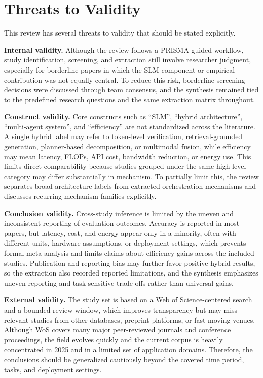 \section{Threats to Validity}
This review has several threats to validity that should be stated explicitly.

\textbf{Internal validity.} Although the review follows a PRISMA-guided workflow, study identification, screening, and extraction still involve researcher judgment, especially for borderline papers in which the SLM component or empirical contribution was not equally central. To reduce this risk, borderline screening decisions were discussed through team consensus, and the synthesis remained tied to the predefined research questions and the same extraction matrix throughout.

\textbf{Construct validity.} Core constructs such as ``SLM'', ``hybrid architecture'', ``multi-agent system'', and ``efficiency'' are not standardized across the literature. A single hybrid label may refer to token-level verification, retrieval-grounded generation, planner-based decomposition, or multimodal fusion, while efficiency may mean latency, FLOPs, API cost, bandwidth reduction, or energy use. This limits direct comparability because studies grouped under the same high-level category may differ substantially in mechanism. To partially limit this, the review separates broad architecture labels from extracted orchestration mechanisms and discusses recurring mechanism families explicitly.

\textbf{Conclusion validity.} Cross-study inference is limited by the uneven and inconsistent reporting of evaluation outcomes. Accuracy is reported in most papers, but latency, cost, and energy appear only in a minority, often with different units, hardware assumptions, or deployment settings, which prevents formal meta-analysis and limits claims about efficiency gains across the included studies. Publication and reporting bias may further favor positive hybrid results, so the extraction also recorded reported limitations, and the synthesis emphasizes uneven reporting and task-sensitive trade-offs rather than universal gains.

\textbf{External validity.} The study set is based on a Web of Science-centered search and a bounded review window, which improves transparency but may miss relevant studies from other databases, preprint platforms, or fast-moving venues. Although WoS covers many major peer-reviewed journals and conference proceedings, the field evolves quickly and the current corpus is heavily concentrated in 2025 and in a limited set of application domains. Therefore, the conclusions should be generalized cautiously beyond the covered time period, tasks, and deployment settings.
